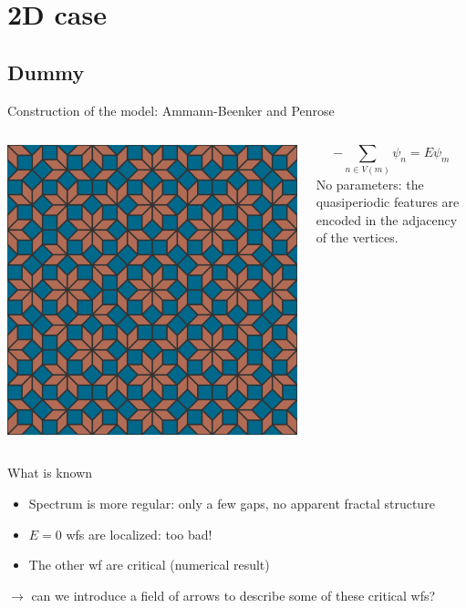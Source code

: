 \documentclass[xcolor=x11names,compress,professionalfonts]{beamer}
\renewcommand{\(}{\begin{columns}}
\renewcommand{\)}{\end{columns}}
\newcommand{\<}[1]{\begin{column}{#1}}
\renewcommand{\>}{\end{column}}
\begin{document}
\section{2D case}
\subsection{Dummy}

\begin{frame}{Construction of the model: Ammann-Beenker and Penrose}
\begin{columns}
\begin{column}{5cm}
{\centering
\includegraphics[scale=.1]{img/ammann-beenker.png}

}
\end{column}
\begin{column}{5cm}
\[
	-\sum_{n \in V(m)} \psi_n = E \psi_m
\]
No parameters: the quasiperiodic features are encoded in the adjacency of the vertices.
\end{column}
\end{columns}
\end{frame}

\begin{frame}{What is known}
\begin{itemize}
	\item Spectrum is more regular: only a few gaps, no apparent fractal structure
	\item $E = 0$ wfs are localized: too bad!
	\item The other wf are critical (numerical result)
\end{itemize}
$\rightarrow$ can we introduce a field of arrows to describe some of these critical wfs?
\end{frame}
\end{document}
